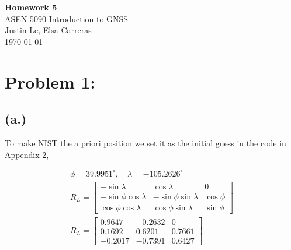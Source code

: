 \documentclass[11pt]{article}
\begin{document}
\begin{center}
    {\Large \textbf{Homework 5}}\\[0.5em]
    {\large ASEN 5090 Introduction to GNSS}\\[0.5em]
    Justin Le, Elsa Carreras\\
    \today
\end{center}

\vspace{1em}

\section*{Problem 1:}
\subsection*{(a.)}
\hspace*{2em}To make NIST the a priori position we set it as the initial guess in the code in Appendix 2,

\begin{gather*}
\phi = 39.9951^\circ, \quad \lambda = -105.2626^\circ \\
R_L = \begin{bmatrix} -\sin\lambda & \cos\lambda & 0 \\ -\sin\phi\cos\lambda & -\sin\phi\sin\lambda & \cos\phi \\ \cos\phi\cos\lambda & \cos\phi\sin\lambda & \sin\phi \end{bmatrix} \\
R_L = \begin{bmatrix} 0.9647 & -0.2632 & 0 \\ 0.1692 & 0.6201 & 0.7661 \\ -0.2017 & -0.7391 & 0.6427 \end{bmatrix}
\end{gather*}
\end{document}
